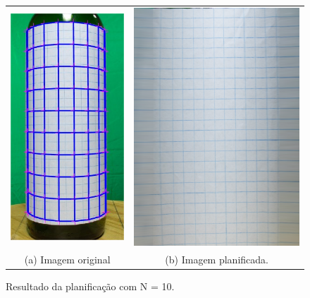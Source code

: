 \begin{figure}[ht]
    \caption{Resultado da planificação com N = 10.}     
    \centering
    \vspace{0.3cm}
    \begin{minipage}{.5\textwidth}
      \centering
            \begin{tabular}{cc}
            \includegraphics[width=.4\linewidth]{TCC/Imagens/ensaios/a_1010.jpg} 
            &
            \includegraphics[width=.55\linewidth]{TCC/Imagens/ensaios/b_1010.png}
            \\
            (a) Imagem original & (b) Imagem planificada.
            \end{tabular}
	\end{minipage}
    \label{fig:ensaio_2_1010a}
\end{figure}

